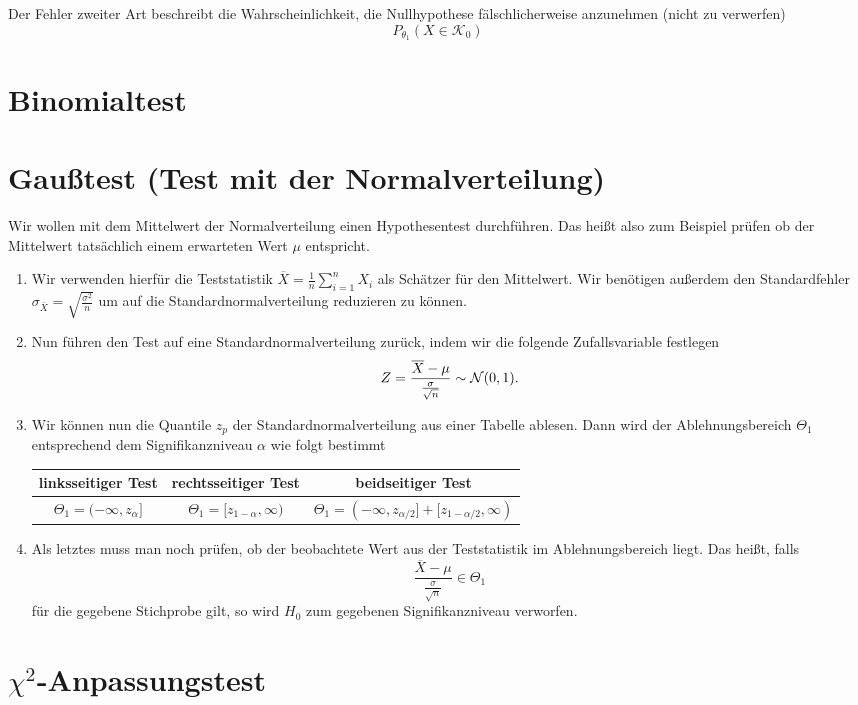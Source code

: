 Der Fehler zweiter Art beschreibt die Wahrscheinlichkeit, die Nullhypothese fälschlicherweise anzunehmen (nicht zu verwerfen)
\begin{equation*}
	P_{\theta_1}(X\in \mathcal K_0)
\end{equation*}

\section{Binomialtest}

\section{Gaußtest (Test mit der Normalverteilung)}
Wir wollen mit dem Mittelwert der Normalverteilung einen Hypothesentest durchführen. Das heißt also zum Beispiel prüfen ob der Mittelwert tatsächlich einem erwarteten Wert $\mu$ entspricht.
\begin{enumerate}
	\item Wir verwenden hierfür die Teststatistik $\overline X=\frac1n\sum_{i=1}^n X_i$ als Schätzer für den Mittelwert. Wir benötigen außerdem den Standardfehler $\sigma_{\overline X}=\sqrt{\frac{\sigma^2}{n}}$ um auf die Standardnormalverteilung reduzieren zu können.
	\item Nun führen den Test auf eine Standardnormalverteilung zurück, indem wir die folgende Zufallsvariable festlegen
	\begin{equation*}
		Z=\frac{\overline X-\mu}{\frac{\sigma}{\sqrt n}}\sim\mathcal{N}(0,1).
	\end{equation*}
	\item Wir können nun die Quantile $z_p$ der Standardnormalverteilung aus einer Tabelle ablesen.
	Dann wird der Ablehnungsbereich $\Theta_1$ entsprechend dem Signifikanzniveau $\alpha$ wie folgt bestimmt
	\begin{center}
		\begin{tabular}{c|c|c}
			linksseitiger Test&rechtsseitiger Test&beidseitiger Test\\\hline
			$\Theta_1=(-\infty, z_{\alpha}]$&$\Theta_1=[z_{1-\alpha},\infty)$&$\Theta_1=(-\infty, z_{\alpha/2}]+[z_{1-\alpha/2},\infty)$
		\end{tabular}
	\end{center}
	\item Als letztes muss man noch prüfen, ob der beobachtete Wert aus der Teststatistik im Ablehnungsbereich liegt. Das heißt, falls
	\begin{equation*}
	 	\frac{\overline X-\mu}{\frac{\sigma}{\sqrt n}}\in \Theta_1
	\end{equation*}
	für die gegebene Stichprobe gilt, so wird $H_0$ zum gegebenen Signifikanzniveau verworfen.
\end{enumerate}

\section{$\chi^2$-Anpassungstest}
